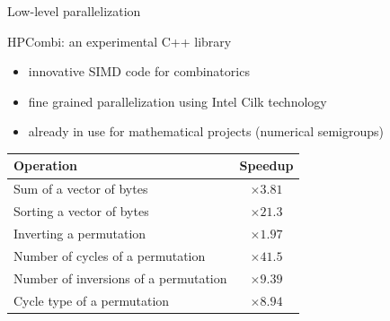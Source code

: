 \documentclass{beamer}
\begin{document}
\begin{frame}{Low-level parallelization}

  \begin{block}{HPCombi: an experimental C++ library}
  \begin{itemize}
  \item innovative SIMD code for combinatorics
  \item fine grained parallelization using Intel Cilk technology
  \item already in use for mathematical projects (numerical semigroups)
  \end{itemize}
  \end{block}

  \begin{center}\begin{tabular}{l|c}
  Operation & Speedup \\\hline
  Sum of a vector of bytes & $\times 3.81$\\
  Sorting a vector of bytes& $\times 21.3$\\
  Inverting a permutation& $\times 1.97$\\
  Number of cycles of a permutation& $\times 41.5$\\
  Number of inversions of a permutation& $\times 9.39$\\
  Cycle type of a permutation& $\times 8.94$\\
  \end{tabular}\end{center}

\end{frame}
\end{document}
